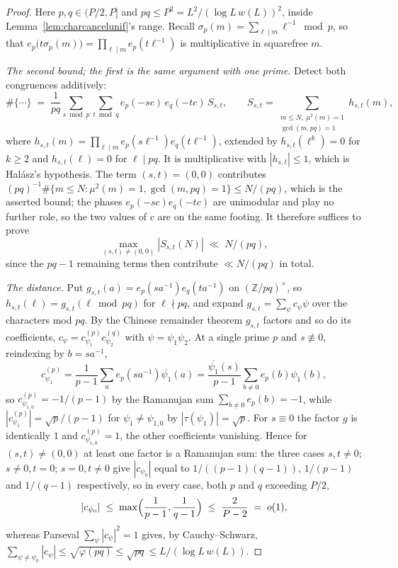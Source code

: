 \documentclass[11pt]{article}
\theoremstyle{definition}
\begin{document}
\begin{proof}
Here $p,q\in(P/2,P]$ and $pq\le P^2=L^2/(\log L\,w(L))^2$, inside
Lemma~\ref{lem:charcancelunif}'s range. Recall
$\sigma_p(m)=\sum_{\ell\mid m}\ell^{-1}\bmod p$, so that $e_p\bigl(t\sigma_p(m)\bigr)
=\prod_{\ell\mid m}e_p(t\ell^{-1})$ is multiplicative in squarefree $m$.

\emph{The second bound; the first is the same argument with one prime.} Detect both congruences
additively:
\[ \#\{\cdots\}\;=\;\frac1{pq}\sum_{s\bmod p}\sum_{t\bmod q}e_p(-sc)\,e_q(-tc)\,S_{s,t},\qquad
   S_{s,t}=\!\!\sum_{\substack{m\le N,\ \mu^2(m)=1\\ \gcd(m,pq)=1}}\!\!h_{s,t}(m), \]
where $h_{s,t}(m)=\prod_{\ell\mid m}e_p(s\ell^{-1})e_q(t\ell^{-1})$, extended by
$h_{s,t}(\ell^k)=0$ for $k\ge2$ and $h_{s,t}(\ell)=0$ for $\ell\mid pq$. It is multiplicative with
$|h_{s,t}|\le1$, which is Hal\'asz's hypothesis. The term $(s,t)=(0,0)$ contributes
$(pq)^{-1}\#\{m\le N:\mu^2(m)=1,\gcd(m,pq)=1\}\le N/(pq)$, which is the asserted bound; the phases
$e_p(-sc)e_q(-tc)$ are unimodular and play no further role, so the two values of $c$ are on the same
footing. It therefore suffices to prove
\[ \max_{(s,t)\ne(0,0)}|S_{s,t}(N)|\;\ll\;N/(pq), \tag{$\ast$} \]
since the $pq-1$ remaining terms then contribute $\ll N/(pq)$ in total.

\emph{The distance.} Put $g_{s,t}(a)=e_p(sa^{-1})e_q(ta^{-1})$ on $(\mathbb Z/pq)^\times$, so
$h_{s,t}(\ell)=g_{s,t}(\ell\bmod pq)$ for $\ell\nmid pq$, and expand
$g_{s,t}=\sum_\psi c_\psi\psi$ over the characters mod $pq$. By the Chinese remainder theorem
$g_{s,t}$ factors and so do its coefficients, $c_\psi=c^{(p)}_{\psi_1}c^{(q)}_{\psi_2}$ with
$\psi=\psi_1\psi_2$. At a single prime $p$ and $s\not\equiv0$, reindexing by $b=sa^{-1}$,
\[ c^{(p)}_{\psi_1}=\frac1{p-1}\sum_{a}e_p(sa^{-1})\overline{\psi_1}(a)
   =\frac{\overline{\psi_1}(s)}{p-1}\sum_{b\ne0}e_p(b)\psi_1(b), \]
so $c^{(p)}_{\psi_{1,0}}=-1/(p-1)$ by the Ramanujan sum $\sum_{b\ne0}e_p(b)=-1$, while
$|c^{(p)}_{\psi_1}|=\sqrt p/(p-1)$ for $\psi_1\ne\psi_{1,0}$ by $|\tau(\psi_1)|=\sqrt p$. For
$s\equiv0$ the factor $g$ is identically $1$ and $c^{(p)}_{\psi_{1,0}}=1$, the other coefficients
vanishing. Hence for $(s,t)\ne(0,0)$ at least one factor is a Ramanujan sum: the three cases
$s,t\ne0$; $s\ne0,t=0$; $s=0,t\ne0$ give $|c_{\psi_0}|$ equal to $1/((p-1)(q-1))$, $1/(p-1)$ and
$1/(q-1)$ respectively, so in every case, both $p$ and $q$ exceeding $P/2$,
\[ |c_{\psi_0}|\;\le\;\max\Bigl(\frac1{p-1},\frac1{q-1}\Bigr)\;\le\;\frac{2}{P-2}\;=\;o(1), \]
whereas Parseval $\sum_\psi|c_\psi|^2=1$ gives, by Cauchy--Schwarz,
$\sum_{\psi\ne\psi_0}|c_\psi|\le\sqrt{\varphi(pq)}\le\sqrt{pq}\le L/(\log L\,w(L))$.


\end{proof}
\end{document}
